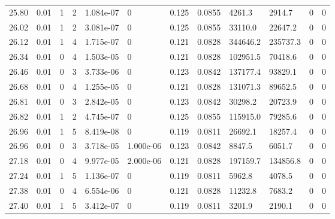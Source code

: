 \documentclass[preview]{standalone}
\begin{document}
{{{{{{{\begin{tabular}{L{1.2cm}C{1.2cm} C{0.3cm}C{0.5cm} C{1.4cm}C{1.4cm} C{1.4cm}C{1.4cm} C{1.6cm}C{1.6cm} C{1.6cm}C{1.6cm}}
  25.80  &  0.01  & 1     &  2 &  1.084e-07  & 0  &  0.125&   0.0855& 4261.3 & 2914.7   &  0 & 0  \\ 
  26.02  &  0.01  & 1     &  2 &  3.081e-07  & 0  &  0.125&   0.0855& 33110.0 & 22647.2   &  0 & 0  \\ 
  26.12  &  0.01  & 1     &  4 &  1.715e-07  & 0  &  0.121&   0.0828& 344646.2 & 235737.3   &  0 & 0  \\ 
  26.34  &  0.01  & 0     &  4 &  1.503e-05  & 0  &  0.121&   0.0828& 102951.5 & 70418.6   &  0 & 0  \\ 
  26.46  &  0.01  & 0     &  3 &  3.733e-06  & 0  &  0.123&   0.0842& 137177.4 & 93829.1   &  0 & 0  \\ 
  26.68  &  0.01  & 0     &  4 &  1.255e-05  & 0  &  0.121&   0.0828& 131071.3 & 89652.5   &  0 & 0  \\ 
  26.81  &  0.01  & 0     &  3 &  2.842e-05  & 0  &  0.123&   0.0842& 30298.2 & 20723.9   &  0 & 0  \\ 
  26.82  &  0.01  & 1     &  2 &  4.745e-07  & 0  &  0.125&   0.0855& 115915.0 & 79285.6   &  0 & 0  \\ 
  26.96  &  0.01  & 1     &  5 &  8.419e-08  & 0  &  0.119&   0.0811& 26692.1 & 18257.4   &  0 & 0  \\ 
  26.96  &  0.01  & 0     &  3 &  3.718e-05  & 1.000e-06  &  0.123&   0.0842& 8847.5 & 6051.7   &  0 & 0  \\ 
  27.18  &  0.01  & 0     &  4 &  9.977e-05  & 2.000e-06  &  0.121&   0.0828& 197159.7 & 134856.8   &  0 & 0  \\ 
  27.24  &  0.01  & 1     &  5 &  1.136e-07  & 0  &  0.119&   0.0811& 5962.8 & 4078.5   &  0 & 0  \\ 
  27.38  &  0.01  & 0     &  4 &  6.554e-06  & 0  &  0.121&   0.0828& 11232.8 & 7683.2   &  0 & 0  \\ 
  27.40  &  0.01  & 1     &  5 &  3.412e-07  & 0  &  0.119&   0.0811& 3201.9 & 2190.1   &  0 & 0  \\ 
\hline 
\end{tabular} 

}}}}}}}
\end{document}
